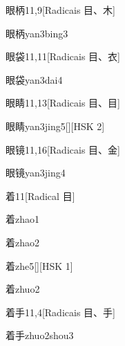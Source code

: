 \begin{entry}{眼柄}{11,9}[Radicais ⽬、⽊]
  \begin{phonetics}{眼柄}{yan3bing3}
  \end{phonetics}
\end{entry}

\begin{entry}{眼袋}{11,11}[Radicais ⽬、⾐]
  \begin{phonetics}{眼袋}{yan3dai4}
  \end{phonetics}
\end{entry}

\begin{entry}{眼睛}{11,13}[Radicais ⽬、⽬]
  \begin{phonetics}{眼睛}{yan3jing5}[][HSK 2]
  \end{phonetics}
\end{entry}

\begin{entry}{眼镜}{11,16}[Radicais ⽬、⾦]
  \begin{phonetics}{眼镜}{yan3jing4}
  \end{phonetics}
\end{entry}

\begin{entry}{着}{11}[Radical ⽬]
  \begin{phonetics}{着}{zhao1}
  \end{phonetics}
  \begin{phonetics}{着}{zhao2}
  \end{phonetics}
  \begin{phonetics}{着}{zhe5}[][HSK 1]
  \end{phonetics}
  \begin{phonetics}{着}{zhuo2}
  \end{phonetics}
\end{entry}

\begin{entry}{着手}{11,4}[Radicais ⽬、⼿]
  \begin{phonetics}{着手}{zhuo2shou3}
  \end{phonetics}
\end{entry}

